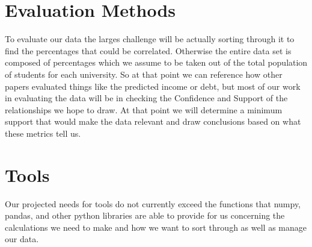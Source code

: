 \documentclass[11pt]{article}
\begin{document}
\section*{Evaluation Methods}
\label{sec-3}
To evaluate our data the larges challenge will be actually sorting through it to find the percentages that could be correlated. Otherwise the entire data set is composed of percentages which we assume to be taken out of the total population of students for each university. So at that point we can reference how other papers evaluated things like the predicted income or debt, but most of our work in evaluating the data will be in checking the Confidence and Support of the relationships we hope to draw. At that point we will determine a minimum support that would make the data relevant and draw conclusions based on what these metrics tell us.
\section*{Tools}
\label{sec-4}
Our projected needs for tools do not currently exceed the functions that numpy, pandas, and other python libraries are able to provide for us concerning the calculations we need to make and how we want to sort through as well as manage our data.
\end{document}
